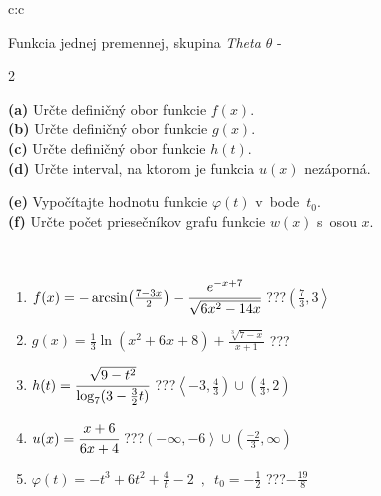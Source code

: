 \documentclass[10pt]{report}
\begin{document}
\begin{tabular}{c:c}
\begin{minipage}[c][104.5mm][t]{0.5\linewidth}
\begin{center}
\vspace{7mm}
{\huge Funkcia jednej premennej, skupina \textit{Theta $\theta$} -}\\[5mm]
\begin{minipage}{0.95\linewidth}
\begin{center}
{\small \begin{multicols}{2} \raggedright
\textbf{(a)} Určte definičný obor funkcie \(f(x)\). \\[1mm]
\textbf{(b)} Určte definičný obor funkcie \(g(x)\). \\[1mm]
\textbf{(c)} Určte definičný obor funkcie \(h(t)\). \\[1mm]
\textbf{(d)} Určte interval, na ktorom je funkcia \(u(x)\) nezáporná. \par \columnbreak
\textbf{(e)} Vypočítajte hodnotu funkcie \(\varphi(t)\) v~bode~\(t_0\). \\[1mm]
\textbf{(f)} Určte počet priesečníkov grafu funkcie \(w(x)\) s~osou \(x\). \\[1mm]
\end{multicols}
}
\end{center}
\end{minipage}
\\[4mm]
\begin{minipage}{0.79\linewidth}
\begin{center}
\begin{varwidth}{\linewidth}
\begin{enumerate}
\small
\item $f(x) = -\arcsin\!\left( \frac{7-3x}{2} \right) - \cfrac{e^{-x+7}}{\sqrt{6x^2-14x}}$\quad \dotfill\; ???\;\dotfill \quad $\left(\frac{7}{3} , 3\right\rangle$
\item $g(x) = \frac{1}{3} \ln{\!(x^2+6x+8)}+\frac{\sqrt[3]{7-x}}{x+1}$\quad \dotfill\; ???\;\dotfill {}
\item $h(t) = \cfrac{\sqrt{9-t^2}}{\log_7(3-\frac{3}{2}t)}$\quad \dotfill\; ???\;\dotfill \quad $\left\langle-3 , \frac{4}{3}\right)\cup\left(\frac{4}{3} , 2\right)$
\item $u(x) = \cfrac{x+6}{6x+4}$\quad \dotfill\; ???\;\dotfill \quad $\left(-\infty , -6\right\rangle\cup\left(\frac{-2}{3} , \infty\right)$
\item $\varphi(t) = -t^3+6t^2+\frac{4}{t}-2 \enspace , \enspace t_0=-\frac{1}{2}$\quad \dotfill\; ???\;\dotfill \quad $-\frac{19}{8}$

\end{enumerate}
\end{varwidth}
\end{center}
\end{minipage}
\end{center}
\end{minipage}
\end{tabular}
\end{document}

